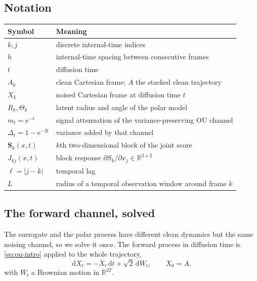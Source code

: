 \documentclass[11pt,a4paper]{article}
\newcommand{\R}{\mathbb{R}}
\newcommand{\score}{\bm S}
\newcommand{\mt}{m_t}
\newcommand{\Dt}{\Delta_t}
\newcommand{\dd}{\,\mathrm d}
\newcommand{\e}{\mathrm e}
\begin{document}
\subsection{Notation}

\begin{table}[H]
\centering\small
\begin{tabularx}{\textwidth}{@{}lX@{}}
\toprule
Symbol & Meaning \\
\midrule
$k,j$ & discrete internal-time indices \\
$h$ & internal-time spacing between consecutive frames \\
$t$ & diffusion time \\
$A_k$ & clean Cartesian frame; $A$ the stacked clean trajectory \\
$X_k$ & noised Cartesian frame at diffusion time $t$ \\
$R_k,\Theta_k$ & latent radius and angle of the polar model \\
$\mt=\e^{-t}$ & signal attenuation of the variance-preserving OU channel \\
$\Dt=1-\e^{-2t}$ & variance added by that channel \\
$\score_k(x,t)$ & $k$th two-dimensional block of the joint score \\
$J_{kj}(x,t)$ & block response $\partial S_k/\partial x_j\in\R^{2\times2}$ \\
$\ell=|j-k|$ & temporal lag \\
$L$ & radius of a temporal observation window around frame $k$ \\
\bottomrule
\end{tabularx}
\end{table}

\subsection{The forward channel, solved}\label{sec:channel}

The surrogate and the polar process have different clean dynamics but the same noising
channel, so we solve it once. The forward process in diffusion time is \eqref{eq:ou-intro}
applied to the whole trajectory,
\begin{equation}
 \dd X_t=-X_t\dd t+\sqrt2\dd W_t,\qquad X_0=A ,
 \label{eq:ou-sde}
\end{equation}
with $W_t$ a Brownian motion in $\R^{2T}$.
\end{document}
